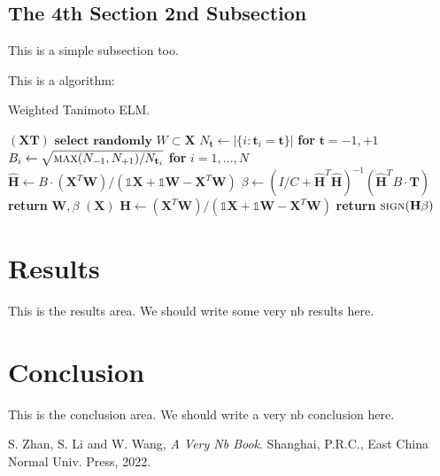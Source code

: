 \documentclass[lettersize,journal,12pt]{IEEEtran}
\begin{document}
\subsection{The 4th Section 2nd Subsection}

This is a simple subsection too.

This is a algorithm:

\begin{algorithm}[H]
	\caption{Weighted Tanimoto ELM.}\label{alg:alg1}
	\begin{algorithmic}
		\STATE
		$(\mathbf{X} \mathbf{T})$
		\STATE \hspace{0.5cm}$ \textbf{select randomly } W \subset \mathbf{X}  $
		\STATE \hspace{0.5cm}$ N_\mathbf{t} \gets | \{ i : \mathbf{t}_i = \mathbf{t} \} | $ \textbf{ for } $ \mathbf{t}= -1,+1 $
		\STATE \hspace{0.5cm}$ B_i \gets \sqrt{ \textsc{max}(N_{-1},N_{+1}) / N_{\mathbf{t}_i} } $ \textbf{ for } $ i = 1,...,N $
		\STATE \hspace{0.5cm}$ \hat{\mathbf{H}} \gets  B \cdot (\mathbf{X}^T\textbf{W})/( \mathbb{1}\mathbf{X} + \mathbb{1}\textbf{W} - \mathbf{X}^T\textbf{W} ) $
		\STATE \hspace{0.5cm}$ \beta \gets \left ( I/C + \hat{\mathbf{H}}^T\hat{\mathbf{H}} \right )^{-1}(\hat{\mathbf{H}}^T B\cdot \mathbf{T})  $
		\STATE \hspace{0.5cm}\textbf{return}  $\textbf{W},  \beta $
		\STATE
		$(\mathbf{X} )$
		\STATE \hspace{0.5cm}$ \mathbf{H} \gets  (\mathbf{X}^T\textbf{W} )/( \mathbb{1}\mathbf{X}  + \mathbb{1}\textbf{W}- \mathbf{X}^T\textbf{W}  ) $
		\STATE \hspace{0.5cm}\textbf{return}  $\textsc{sign}( \mathbf{H} \beta )$
	\end{algorithmic}
	\label{alg1}
\end{algorithm}

\section{Results}

This is the results area. We should write some very nb results here.

\section{Conclusion}

This is the conclusion area. We should write a very nb conclusion here.



\begin{thebibliography}{1}

	S. Zhan, S. Li and W. Wang, {\it{A Very Nb Book}}. Shanghai, P.R.C., East China Normal  Univ. Press, 2022.

\end{thebibliography}
\end{document}
